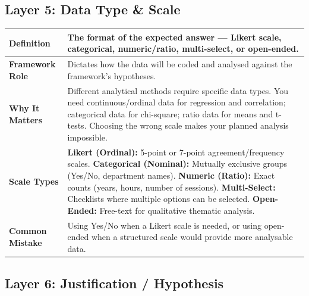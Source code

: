 \documentclass[12pt,a4paper]{article}
\begin{document}
\subsection{Layer 5: Data Type \& Scale}

\begin{table}[H]\centering\small
\begin{tabularx}{\textwidth}{L{3cm} X}
\toprule
\textbf{Definition} & The format of the expected answer --- Likert scale, categorical, numeric/ratio, multi-select, or open-ended. \\
\midrule
\textbf{Framework Role} & Dictates how the data will be coded and analysed against the framework's hypotheses. \\
\midrule
\textbf{Why It Matters} & Different analytical methods require specific data types. You need continuous/ordinal data for regression and correlation; categorical data for chi-square; ratio data for means and t-tests. Choosing the wrong scale makes your planned analysis impossible. \\
\midrule
\textbf{Scale Types} & \textbf{Likert (Ordinal):} 5-point or 7-point agreement/frequency scales. \newline \textbf{Categorical (Nominal):} Mutually exclusive groups (Yes/No, department names). \newline \textbf{Numeric (Ratio):} Exact counts (years, hours, number of sessions). \newline \textbf{Multi-Select:} Checklists where multiple options can be selected. \newline \textbf{Open-Ended:} Free-text for qualitative thematic analysis. \\
\midrule
\textbf{Common Mistake} & Using Yes/No when a Likert scale is needed, or using open-ended when a structured scale would provide more analysable data. \\
\bottomrule
\end{tabularx}
\end{table}

\subsection{Layer 6: Justification / Hypothesis}
\end{document}
